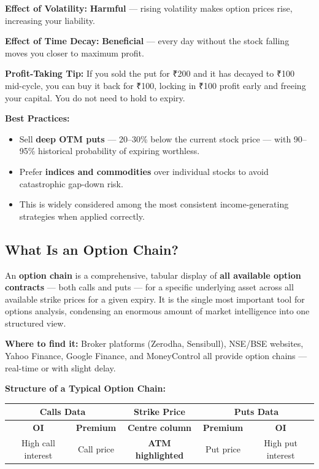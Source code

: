 \documentclass[12pt,openany]{book}
\begin{document}
\textbf{Effect of Volatility:} \textbf{Harmful} — rising volatility makes option prices rise, increasing your liability.

\textbf{Effect of Time Decay:} \textbf{Beneficial} — every day without the stock falling moves you closer to maximum profit.

\textbf{Profit-Taking Tip:} If you sold the put for ₹200 and it has decayed to ₹100 mid-cycle, you can buy it back for ₹100, locking in ₹100 profit early and freeing your capital. You do not need to hold to expiry.

\textbf{Best Practices:}
\begin{itemize}[leftmargin=*]
    \item Sell \textbf{deep OTM puts} — 20–30\% below the current stock price — with 90–95\% historical probability of expiring worthless.
    \item Prefer \textbf{indices and commodities} over individual stocks to avoid catastrophic gap-down risk.
    \item This is widely considered among the most consistent income-generating strategies when applied correctly.
\end{itemize}

\subsection{What Is an Option Chain?}

An \textbf{option chain} is a comprehensive, tabular display of \textbf{all available option contracts} — both calls and puts — for a specific underlying asset across all available strike prices for a given expiry. It is the single most important tool for options analysis, condensing an enormous amount of market intelligence into one structured view.

\textbf{Where to find it:} Broker platforms (Zerodha, Sensibull), NSE/BSE websites, Yahoo Finance, Google Finance, and MoneyControl all provide option chains — real-time or with slight delay.

\textbf{Structure of a Typical Option Chain:}


\begin{center}
\scriptsize
\setlength{\tabcolsep}{5pt}
\renewcommand{\arraystretch}{1.2}
\begin{tabular}{|c|c|c|c|c|}
\hline
\multicolumn{2}{|c|}{\textbf{Calls Data}} & \textbf{Strike Price} & \multicolumn{2}{c|}{\textbf{Puts Data}} \\
\hline
\textbf{OI} & \textbf{Premium} & \textbf{Centre column} & \textbf{Premium} & \textbf{OI} \\
\hline
High call interest & Call price & \textbf{ATM highlighted} & Put price & High put interest \\
\hline
\end{tabular}
\end{center}
\end{document}
